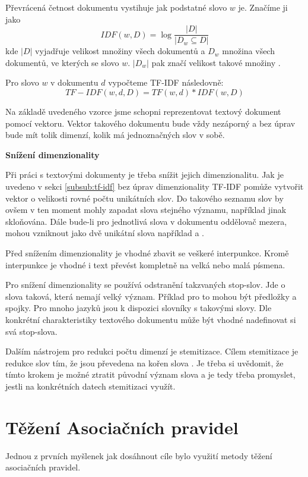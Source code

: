 \documentclass[thesis=M,czech]{FITthesis}[2012/10/20]
\begin{document}
\begin{itemize}
			Převrácená četnost dokumentu vystihuje jak podstatné slovo $w$ je. Značíme ji jako $$IDF(w,D) = \log{\frac{|D|}{|D_w \subseteq D|}}$$ kde $|D|$ vyjadřuje velikost množiny všech dokumentů a $D_w$ množina všech dokumentů, ve kterých se slovo $w$. $|D_w|$ pak značí velikost takové množiny \cite{RamosTF-IDF}.
			
			Pro slovo $w$ v dokumentu $d$ vypočteme TF-IDF následovně:
			$$TF-IDF(w,d,D) = TF(w,d) * IDF(w,D)$$
			
			Na základě uvedeného vzorce jsme schopni reprezentovat textový dokument pomocí vektoru. Vektor takového dokumentu bude vždy nezáporný a bez úprav bude mít tolik dimenzí, kolik má jednoznačných slov v sobě.
			
		\textbf{Snížení dimenzionality}
		
			Při práci s textovými dokumenty je třeba snížit jejich dimenzionalitu. Jak je uvedeno v sekci \ref{subsub:tf-idf} bez úprav dimenzionality TF-IDF pomůže vytvořit vektor o velikosti rovné počtu unikátních slov. Do takového seznamu slov by ovšem v ten moment mohly zapadat slova stejného významu, například jinak skloňována. Dále bude-li pro jednotlivá slova v dokumentu oddělovač mezera, mohou vzniknout jako dvě unikátní slova například  a .
			
			Před snížením dimenzionality je vhodné zbavit se veškeré interpunkce. Kromě interpunkce je vhodné i text převést kompletně na velká nebo malá písmena.
						
			Pro snížení dimenzionality se používá odstranění takzvaných stop-slov. Jde o slova taková, která nemají velký význam. Příklad pro to mohou být předložky a spojky. Pro mnoho jazyků jsou k dispozici slovníky s takovými slovy. Dle konkrétní charakteristiky textového dokumentu může být vhodné nadefinovat si svá stop-slova.
			
			Dalším nástrojem pro redukci počtu dimenzí je stemitizace. Cílem stemitizace je redukce slov tím, že jsou převedena na kořen slova \cite{textPreprop}. Je třeba si uvědomit, že tímto krokem je možné ztratit původní význam slova a je tedy třeba promyslet,  jestli na konkrétních datech stemitizaci využít.		
	\end{itemize}
		
		
	\section{Těžení Asociačních pravidel}
		Jednou z prvních myšlenek jak dosáhnout cíle bylo využití metody těžení asociačních pravidel. 
		
\end{document}
